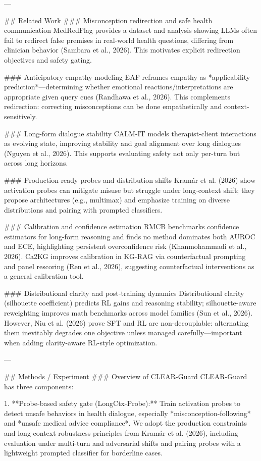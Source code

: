---

## Related Work  
### Misconception redirection and safe health communication  
MedRedFlag provides a dataset and analysis showing LLMs often fail to redirect false premises in real-world health questions, differing from clinician behavior (Sambara et al., 2026). This motivates explicit redirection objectives and safety gating.

### Anticipatory empathy modeling  
EAF reframes empathy as *applicability prediction*—determining whether emotional reactions/interpretations are appropriate given query cues (Randhawa et al., 2026). This complements redirection: correcting misconceptions can be done empathetically and context-sensitively.

### Long-form dialogue stability  
CALM-IT models therapist-client interactions as evolving state, improving stability and goal alignment over long dialogues (Nguyen et al., 2026). This supports evaluating safety not only per-turn but across long horizons.

### Production-ready probes and distribution shifts  
Kramár et al. (2026) show activation probes can mitigate misuse but struggle under long-context shift; they propose architectures (e.g., multimax) and emphasize training on diverse distributions and pairing with prompted classifiers.

### Calibration and confidence estimation  
RMCB benchmarks confidence estimators for long-form reasoning and finds no method dominates both AUROC and ECE, highlighting persistent overconfidence risk (Khanmohammadi et al., 2026). Ca2KG improves calibration in KG-RAG via counterfactual prompting and panel rescoring (Ren et al., 2026), suggesting counterfactual interventions as a general calibration tool.

### Distributional clarity and post-training dynamics  
Distributional clarity (silhouette coefficient) predicts RL gains and reasoning stability; silhouette-aware reweighting improves math benchmarks across model families (Sun et al., 2026). However, Niu et al. (2026) prove SFT and RL are non-decouplable: alternating them inevitably degrades one objective unless managed carefully—important when adding clarity-aware RL-style optimization.

---

## Methods / Experiment  
### Overview of CLEAR-Guard  
CLEAR-Guard has three components:

1. **Probe-based safety gate (LongCtx-Probe):**  
   Train activation probes to detect unsafe behaviors in health dialogue, especially *misconception-following* and *unsafe medical advice compliance*. We adopt the production constraints and long-context robustness principles from Kramár et al. (2026), including evaluation under multi-turn and adversarial shifts and pairing probes with a lightweight prompted classifier for borderline cases.

